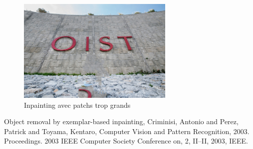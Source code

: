\begin{figure}[ht]
\centering
\includegraphics[width=7.5cm]{img/examples/big_patch.jpg}
\caption{Inpainting avec patchs trop grands}
\end{figure}



\begin{thebibliography}{9}
  Object removal by exemplar-based inpainting,
  Criminisi, Antonio and Perez, Patrick and Toyama, Kentaro,
  Computer Vision and Pattern Recognition, 2003. Proceedings. 2003 IEEE Computer Society Conference on,
  2,
  II--II,
  2003,
  IEEE.

\end{thebibliography}


